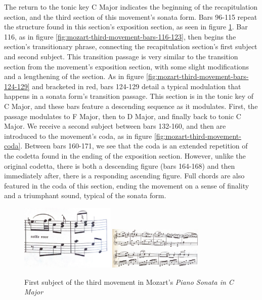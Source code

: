 The return to the tonic key C Major indicates the beginning of the recapitulation section, and the third section of this movement's sonata form. Bars 96-115 repeat the structure found in this section's exposition section, as seen in figure \ref{fig:mozart-third-movement-bars-96-107}\autocite{Henle_1977}. Bar 116, as in figure \ref{fig:mozart-third-movement-bars-116-123}\autocite{Henle_1977}, then begins the section's transitionary phrase, connecting the recapitulation section's first subject and second subject. This transition passage is very similar to the transition section from the movement's exposition section, with some slight modifications and a lengthening of the section. As in figure \ref{fig:mozart-third-movement-bars-124-129}\autocite{Henle_1977} and bracketed in red, bars 124-129 detail a typical modulation that happens in a sonata form's transition passage. This section is in the tonic key of C Major, and these bars feature a descending sequence as it modulates. First, the passage modulates to F Major, then to D Major, and finally back to tonic C Major. We receive a second subject between bars 132-160, and then are introduced to the movement's coda, as in figure \ref{fig:mozart-third-movement-coda}\autocite{Henle_1977}. Between bars 160-171, we see that the coda is an extended repetition of the codetta found in the ending of the exposition section. However, unlike the original codetta, there is both a descending figure (bars 164-168) and then immediately after, there is a responding ascending figure. Full chords are also featured in the coda of this section, ending the movement on a sense of finality and a triumphant sound, typical of the sonata form.

\begin{figure}
	\centering
	\includegraphics[width=0.4\textwidth]{figures/mozart-third-movement-bars-96-97.jpg}
	\includegraphics[width=0.4\textwidth]{figures/mozart-third-movement-bars-98-107.jpg}
	\caption{First subject of the third movement in Mozart's \textit{Piano Sonata in C Major}}
	\label{fig:mozart-third-movement-bars-96-107}
\end{figure}


